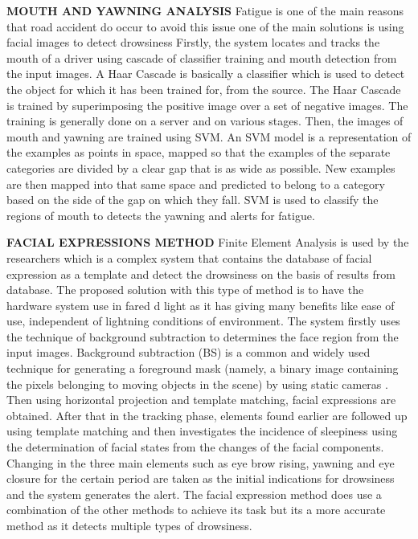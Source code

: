 \textbf{MOUTH AND YAWNING ANALYSIS}
Fatigue is one of the main reasons that road accident do occur to avoid this issue one of the main solutions is using facial images to detect drowsiness \cite{saradadevi2008driver} Firstly, the system locates and tracks the mouth of a driver using cascade of classifier training and mouth detection from the input images. A Haar Cascade is basically a classifier which is used to detect the object for which it has been trained for, from the source. The Haar Cascade \cite{inproceedings} is trained by superimposing the positive image over a set of negative images. The training is generally done on a server and on various stages. Then, the images of mouth and yawning are trained using SVM.  An SVM model is a representation of the examples as points in space, mapped so that the examples of the separate categories are divided by a clear gap that is as wide as possible. New examples are then mapped into that same space and predicted to belong to a category based on the side of the gap on which they fall.
SVM is used to classify the regions of mouth to detects the yawning and alerts for fatigue.\cite{yeo2009can}

\textbf{FACIAL EXPRESSIONS METHOD}
 Finite Element Analysis is used by the researchers which is a complex system that contains the database of facial expression as a template and detect the drowsiness on the basis of results from database\cite{ramzan2019survey}. The proposed solution with this type of method is to have the hardware system use in fared d light as it has giving many benefits like ease of use, independent of lightning conditions of environment. The system firstly uses the technique of background subtraction to determines the face region from the input images. Background subtraction (BS) is a common and widely used technique for generating a foreground mask (namely, a binary image containing the pixels belonging to moving objects in the scene) by using static cameras \cite{wilkinson2013accuracy}. Then using horizontal projection and template matching, facial expressions are obtained. After that in the tracking phase, elements found earlier are followed up using template matching and then investigates the incidence of sleepiness using the determination of facial states from the changes of the facial components. Changing in the three
main elements such as eye brow rising, yawning and eye closure for the certain period are taken as the initial indications for drowsiness and the system generates the alert. The facial expression method does use a combination of the other methods to achieve its task but its a more accurate method as it detects multiple types of drowsiness.\cite{ramzan2019survey} 

